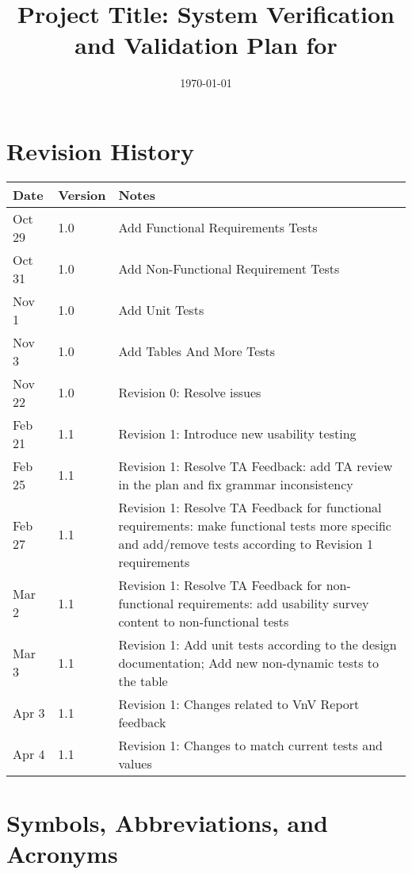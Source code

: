 \documentclass[12pt, titlepage]{article}
\begin{document}
\title{Project Title: System Verification and Validation Plan for \progname{}} 
\author{\authname}
\date{\today}
	
\maketitle


\section*{Revision History}

\begin{tabularx}{\textwidth}{p{3cm}p{2cm}X}
\toprule {\bf Date} & {\bf Version} & {\bf Notes}\\
\midrule
Oct 29 & 1.0 & Add Functional Requirements Tests\\
Oct 31 & 1.0 & Add Non-Functional Requirement Tests\\
Nov 1 & 1.0 & Add Unit Tests\\
Nov 3 & 1.0 & Add Tables And More Tests\\
Nov 22 & 1.0 & Revision 0: Resolve issues\\
Feb 21 & 1.1 & Revision 1: Introduce new usability testing\\
Feb 25 & 1.1 & Revision 1: Resolve TA Feedback: add TA review in the plan and fix grammar inconsistency\\
Feb 27 & 1.1 & Revision 1: Resolve TA Feedback for functional requirements: make functional tests more specific and add/remove tests according to Revision 1 requirements\\
Mar 2 & 1.1 & Revision 1: Resolve TA Feedback for non-functional requirements: add usability survey content to non-functional tests\\
Mar 3 & 1.1 & Revision 1: Add unit tests according to the design documentation; Add new non-dynamic tests to the table\\
Apr 3 & 1.1 & Revision 1: Changes related to VnV Report feedback\\
Apr 4 & 1.1 & Revision 1: Changes to match current tests and values \\
\bottomrule
\end{tabularx}

\newpage

\tableofcontents

\listoftables

\newpage

\section{Symbols, Abbreviations, and Acronyms}
\end{document}
